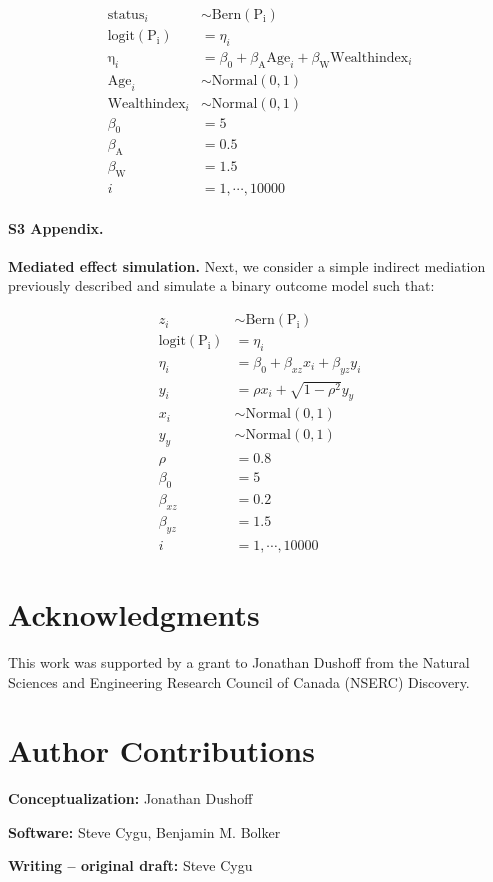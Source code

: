 \begin{align}\label{sim:glm_two_pred}
\mathrm{status}_i &\sim \mathrm{Bern}(\mathrm{P_i}) \nonumber\\
\mathrm{logit}(\mathrm{P_i}) &= \eta_i \nonumber\\
\mathrm{\eta}_i &= \beta_0 + \beta_{\mathrm{A}}\mathrm{Age}_i + \beta_{\mathrm{W}}\mathrm{Wealthindex}_i \nonumber\\
\mathrm{Age}_i &\sim \mathrm{Normal}(0, 1) \nonumber\\
\mathrm{Wealthindex}_i &\sim \mathrm{Normal}(0, 1) \nonumber\\
\beta_0 &= 5 \nonumber\\
\beta_{\mathrm{A}} &= 0.5 \nonumber\\
\beta_{\mathrm{W}} &= 1.5 \nonumber\\
i &= 1,\cdots, 10000
\end{align}

\paragraph*{S3 Appendix.}
\label{S3_Appendix}
{\bf Mediated effect simulation.} Next, we consider a simple indirect mediation previously described and simulate a binary outcome model such that:

\begin{align}\label{sim:simple_mediate}
z_i &\sim \mathrm{Bern}(\mathrm{P_i}) \nonumber\\
\mathrm{logit}(\mathrm{P_i}) &= \eta_i \nonumber\\
\eta_i &= \beta_0 + \beta_{xz} x_i + \beta_{yz} y_i \nonumber\\
y_i &= \rho x_i + \sqrt{1-\rho^2} y_y \nonumber\\
x_i &\sim \mathrm{Normal(0, 1)} \nonumber\\
y_y &\sim \mathrm{Normal(0, 1)} \nonumber\\
\rho &= 0.8 \nonumber\\
\beta_0 &= 5 \nonumber\\
\beta_{xz} &= 0.2 \nonumber\\
\beta_{yz} &= 1.5 \nonumber\\
i &= 1,\cdots, 10000
\end{align}


\section*{Acknowledgments}

This work was supported by a grant to Jonathan Dushoff from the Natural Sciences and Engineering Research Council of Canada (NSERC) Discovery.

\section*{Author Contributions}

\textbf{Conceptualization:} Jonathan Dushoff

\noindent\textbf{Software:} Steve Cygu, Benjamin M. Bolker

\noindent\textbf{Writing – original draft:} Steve Cygu


\nolinenumbers
